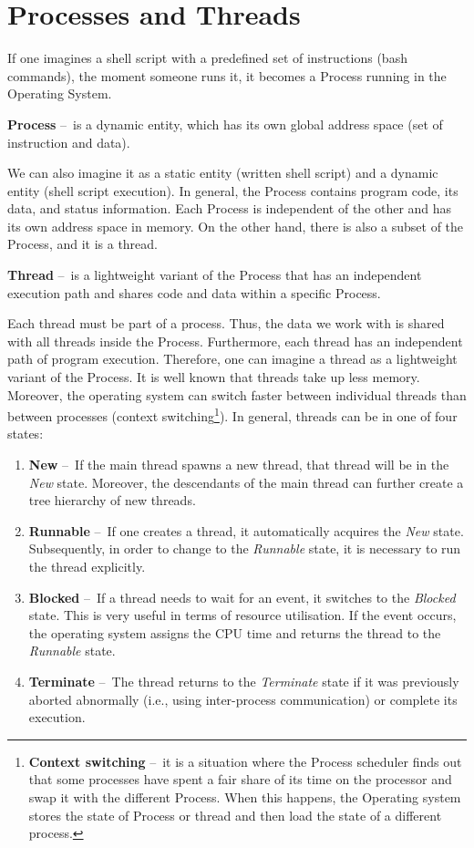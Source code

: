 \section{Processes and Threads}
\label{04:processesandthreads}

If one imagines a shell script with a predefined set of instructions (bash commands), the moment someone runs it, it becomes a Process running in the Operating System.
\begin{definition}
    \textbf{Process} \---\ is a dynamic entity, which has its own global address space (set of instruction and data).
\end{definition}
We can also imagine it as a static entity (written shell script) and a dynamic entity (shell script execution).
In general, the Process contains program code, its data, and status information.
Each Process is independent of the other and has its own address space in memory.
On the other hand, there is also a subset of the Process, and it is a thread.
\begin{definition}
    \textbf{Thread} \---\ is a lightweight variant of the Process that has an independent execution path and shares code and data within a specific Process.
\end{definition}
Each thread must be part of a process.
Thus, the data we work with is shared with all threads inside the Process.
Furthermore, each thread has an independent path of program execution.
Therefore, one can imagine a thread as a lightweight variant of the Process.
It is well known that threads take up less memory.
Moreover, the operating system can switch faster between individual threads than between processes (context switching\footnote {\textbf{Context switching} \---\ it is a situation where the Process scheduler finds out that some processes have spent a fair share of its time on the processor and swap it with the different Process. When this happens, the Operating system stores the state of Process or thread and then load the state of a different process.}). In general, threads can be in one of four states:
\begin{enumerate}[itemsep=1mm, parsep=0pt]
    \item \textbf{New} \---\ If the main thread spawns a new thread, that thread will be in the \emph{New} state.
    Moreover, the descendants of the main thread can further create a tree hierarchy of new threads.
    \item \textbf{Runnable} \---\ If one creates a thread, it automatically acquires the \emph{New} state.
    Subsequently, in order to change to the \emph{Runnable} state, it is necessary to run the thread explicitly.
    \item \textbf {Blocked} \---\ If a thread needs to wait for an event, it switches to the \emph{Blocked} state.
    This is very useful in terms of resource utilisation. If the event occurs, the operating system assigns the CPU time and returns the thread to the \emph{Runnable} state.
    \item \textbf{Terminate} \---\ The thread returns to the \emph {Terminate} state if it was previously aborted abnormally (i.e., using inter-process communication) or complete its execution.
\end{enumerate}

